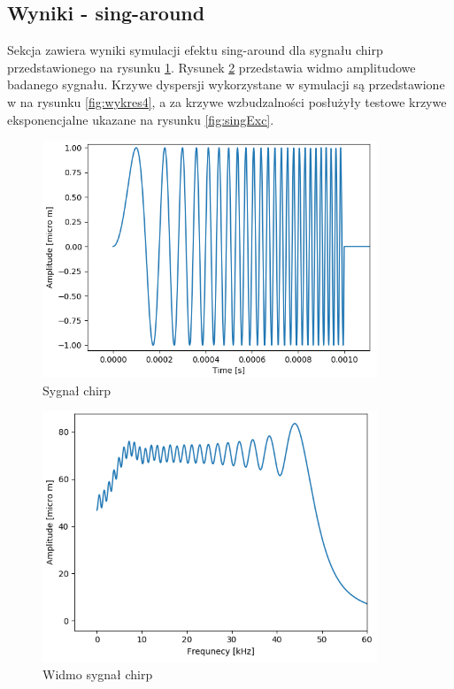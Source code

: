 \subsection{Wyniki - sing-around}
\label{sec:53f}

Sekcja zawiera wyniki symulacji efektu sing-around dla sygnału chirp przedstawionego na rysunku \ref{fig:chirp}. Rysunek \ref{fig:fchirp} przedstawia widmo amplitudowe badanego sygnału. Krzywe dyspersji wykorzystane w symulacji są przedstawione w na rysunku \ref{fig:wykres4}, a za krzywe wzbudzalności posłużyły testowe krzywe eksponencjalne ukazane na rysunku \ref{fig:singExc}.

\begin{figure}[h]
\centering
\includegraphics[width=10cm]{Zdjecia/5/chirp1}
\caption{Sygnał chirp}
\label{fig:chirp}
\end{figure}

\begin{figure}[h]
\centering
\includegraphics[width=10cm]{Zdjecia/5/chirp_widmo}
\caption{Widmo sygnał chirp}
\label{fig:fchirp}
\end{figure}


